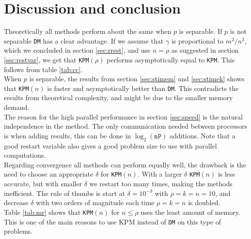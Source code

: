 \chapter{Discussion and conclusion}%

Theoretically all methods perform about the same when $p$ is separable. If $p$ is not separable \texttt{DM} has a clear advantage. If we assume that $\gamma$ is proportional to $m^2/n^2$, which we concluded in section \ref{sec:rrest}, and use $n = \rho$ as suggested in section \ref{sec:restvar}, we get that \texttt{KPM}$(\rho)$ performs asymptotically equal to \texttt{KPM}. This follows from table \ref{tab:cc}. \\

When $p$ is separable, the results from section \ref{sec:stimem} and \ref{sec:stimek} shows that \texttt{KPM}$(n)$ is faster and asymptotically better than \texttt{DM}. This contradicts the results from theoretical complexity, and might be due to the smaller memory demand. \\

The reason for the high parallel performance in section \ref{sec:speed} is the natural independence in the method. The only communication needed between processors is when adding results, this can be done in $\log_2(\texttt{nP})$ additions. Note that a good restart variable also gives a good problem size to use with parallel computations. \\

Regarding convergence all methods can perform equally well, the drawback is the need to choose an appropriate $\delta$ for \texttt{KPM}$(n)$. With a larger $\delta$ \texttt{KPM}$(n)$ is less accurate, but with smaller $\delta$ we restart too many times, making the methods inefficient. The rule of thumbs is start at $\delta=10^{-3}$ with $\rho = k = n = 10$, and decrease $\delta$ with two orders of magnitude each time $\rho = k = n$ is doubled. \\



Table \ref{tab:mr} shows that \texttt{KPM}$(n)$ for $n \leq \rho$ uses the least amount of memory. This is one of the main reasons to use KPM instead of \texttt{DM} on this type of problems. \\

